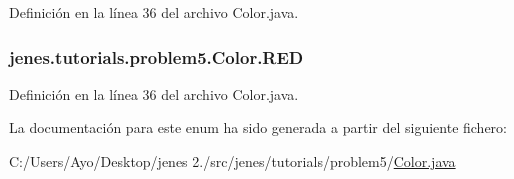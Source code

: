 Definición en la línea 36 del archivo Color.\-java.

\hypertarget{enumjenes_1_1tutorials_1_1problem5_1_1_color_a820ec36787044c1681e2768b18a4a38e}{
\subsubsection[{R\-E\-D}]{\setlength{\rightskip}{0pt plus 5cm}jenes.\-tutorials.\-problem5.\-Color.\-R\-E\-D}}\label{enumjenes_1_1tutorials_1_1problem5_1_1_color_a820ec36787044c1681e2768b18a4a38e}


Definición en la línea 36 del archivo Color.\-java.



La documentación para este enum ha sido generada a partir del siguiente fichero\-:\begin{DoxyCompactItemize}
\item 
C\-:/\-Users/\-Ayo/\-Desktop/jenes 2./src/jenes/tutorials/problem5/\hyperlink{problem5_2_color_8java}{Color.\-java}\end{DoxyCompactItemize}
